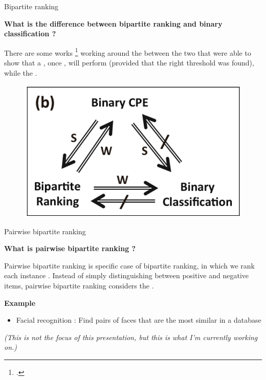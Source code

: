 \begin{frame}{Bipartite ranking}

    {\large\textbf{What is the difference between bipartite ranking and binary classification ?}}

    There are some works \footcite{narasimhan2013relationship} working around the  between the two that were able to show that a , once , will perform  (provided that the right threshold was found), while the . 

    \begin{figure}
        \centering
        \includegraphics[scale=0.3]{images/link.png}
    \end{figure}
    
\end{frame}

\begin{frame}{Pairwise bipartite ranking}

    {\large\textbf{What is pairwise bipartite ranking ?}}

    Pairwise bipartite ranking is specific case of bipartite ranking, in which we rank each instance .  Instead of simply distinguishing between positive and negative items, pairwise bipartite ranking considers the . 

    \vspace{0.3cm}

    {\large\textbf{Example}}
    
    \begin{itemize}
        \item Facial recognition : Find pairs of faces that are the most similar in a database
    \end{itemize}

    \textit{(This is not the focus of this presentation, but this is what I'm currently working on.)}

    
\end{frame}


